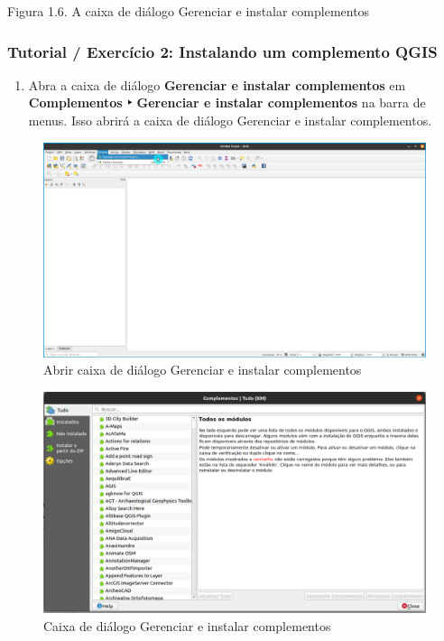 \documentclass[
]{book}
\providecommand{\tightlist}{%
  \setlength{\itemsep}{0pt}\setlength{\parskip}{0pt}}
\begin{document}
Figura 1.6. A caixa de diálogo Gerenciar e instalar complementos

\hypertarget{tutorial-exercuxedcio-2-instalando-um-complemento-qgis}{%
\subsubsection{\texorpdfstring{\textbf{Tutorial / Exercício 2: Instalando um complemento QGIS}}{Tutorial / Exercício 2: Instalando um complemento QGIS}}\label{tutorial-exercuxedcio-2-instalando-um-complemento-qgis}}

\begin{enumerate}
\def\labelenumi{\arabic{enumi}.}
\tightlist
\item
  Abra a caixa de diálogo \textbf{Gerenciar e instalar complementos} em \textbf{Complementos ‣ Gerenciar e instalar complementos} na barra de menus. Isso abrirá a caixa de diálogo Gerenciar e instalar complementos.
\end{enumerate}

\begin{figure}
\centering
\includegraphics{media/modulo1/plugins-menu-2.png}
\caption{Abrir caixa de diálogo Gerenciar e instalar complementos}
\end{figure}

\begin{figure}
\centering
\includegraphics{media/modulo1/manage-and-install-plugins-dialog.png}
\caption{Caixa de diálogo Gerenciar e instalar complementos}
\end{figure}
\end{document}
